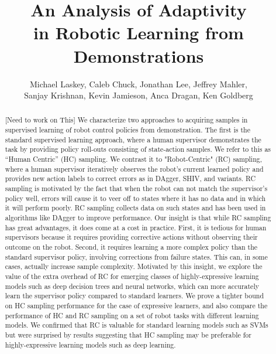 \documentclass[10pt, conference]{ieeeconf}      %
\title{An Analysis of Adaptivity
 \\in  Robotic Learning from Demonstrations}
\author{Michael Laskey, Caleb Chuck, Jonathan Lee, Jeffrey Mahler,\\ Sanjay Krishnan, Kevin Jamieson, Anca Dragan, Ken Goldberg}
\begin{document}
\maketitle
\thispagestyle{empty}
\pagestyle{empty}







\begin{abstract}
[Need to work on This]
We characterize two approaches to acquiring samples in supervised learning of robot control policies from demonstration. The first is the standard supervised learning approach, where a human supervisor demonstrates the task by providing policy roll-outs consisting of state-action samples. We refer to this as “Human Centric” (HC) sampling. We contrast it to "Robot-Centric" (RC) sampling, where a human supervisor iteratively observes the robot’s current learned policy and provides new action labels to correct errors as in DAgger, SHIV, and variants.  RC sampling is motivated by the fact that when the robot can not match the supervisor’s policy well, errors will cause it to veer off to states where it has no data and in which it will perform poorly. RC sampling collects data on such states and has been used in algorithms like DAgger to improve performance. Our insight is that while RC sampling has great advantages, it does come at a cost in practice. First, it is tedious for human supervisors because it requires providing corrective actions without observing their outcome on the robot. Second, it requires learning a more complex policy than the standard supervisor policy, involving corrections from failure states. This can, in some cases, actually increase sample complexity.  Motivated by this insight, we explore the value of the extra overhead of RC for emerging classes of highly-expressive learning models such as deep decision trees and neural networks, which can more accurately learn the supervisor policy compared to standard learners.  We prove a tighter bound on HC sampling performance for the case of expressive learners, and also compare the performance of HC and RC sampling on a set of robot tasks with different learning models.  We confirmed that RC is valuable for standard learning models such as SVMs but were surprised by results suggesting that HC sampling may be preferable for highly-expressive learning models such as deep learning.

 \end{abstract}
\end{document}
